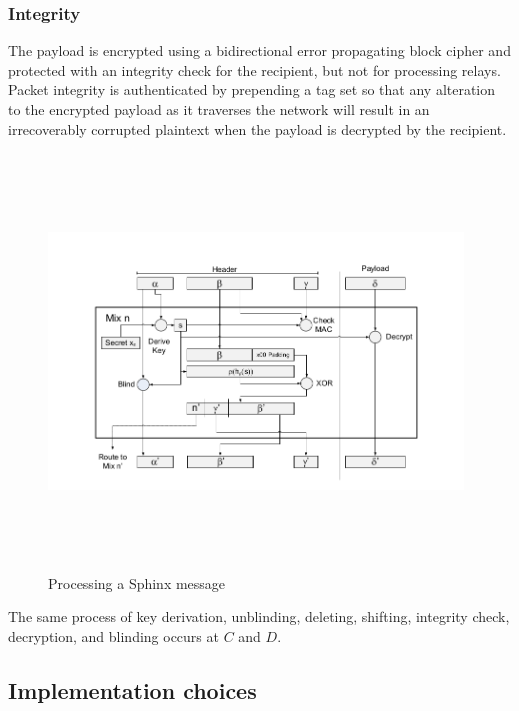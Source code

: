 \subsubsection{Integrity}
The payload is encrypted using a bidirectional error propagating block cipher and protected with an integrity check for the recipient, but not for processing relays. Packet integrity is authenticated by prepending a tag set so that any alteration to the encrypted payload as it traverses the network will result in an irrecoverably corrupted plaintext when the payload is decrypted by the recipient.

\begin{figure}[H]
    \centering
    \includegraphics[width=11cm,height=11cm,keepaspectratio]{../yellowpaper/images/sphinx1.png}
    \caption{Processing a Sphinx message \cite{sphinxpaper}}
    \label{fig:The processing of a Sphinx message }
\end{figure}
The same process of key derivation, unblinding, deleting, shifting, integrity check, decryption, and blinding occurs at $C$ and $D$.

\subsection{Implementation choices}

